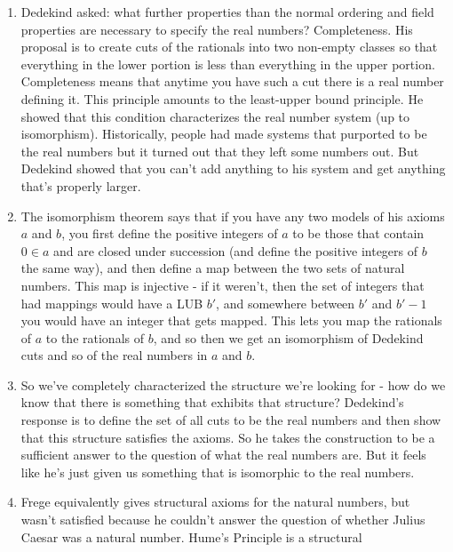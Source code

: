 \documentclass[12pt]{article}
\theoremstyle{definition}
\begin{document}
\begin{enumerate}
    \item
        Dedekind asked: what further properties than the normal ordering and
        field properties are necessary to specify the real numbers?
        Completeness. His proposal is to create cuts of the rationals into two
        non-empty classes so that everything in the lower portion is less than
        everything in the upper portion. Completeness means that anytime you
        have such a cut there is a real number defining it. This principle
        amounts to the least-upper bound principle. He showed that this
        condition characterizes the real number system (up to isomorphism).
        Historically, people had made systems that purported to be the real
        numbers but it turned out that they left some numbers out. But Dedekind
        showed that you can't add anything to his system and get anything
        that's properly larger. 
    \item
        The isomorphism theorem says that if you have any two models of his
        axioms $a$ and $b$, you first define the positive integers of $a$ to be
        those that contain $0 \in a$ and are closed under succession (and
        define the positive integers of $b$ the same way), and then define a
        map between the two sets of natural numbers. This map is injective - if
        it weren't, then the set of integers that had mappings would have a LUB
        $b'$, and somewhere between $b'$ and $b' - 1$ you would have an integer
        that gets mapped. This lets you map the rationals of $a$ to the
        rationals of $b$, and so then we get an isomorphism of Dedekind cuts
        and so of the real numbers in $a$ and $b$. 
    \item
        So we've completely characterized the structure we're looking for - how
        do we know that there is something that exhibits that structure?
        Dedekind's response is to define the set of all cuts to be the real
        numbers and then show that this structure satisfies the axioms. So he
        takes the construction to be a sufficient answer to the question of
        what the real numbers are. But it feels like he's just given us
        something that is isomorphic to the real numbers. 
    \item
        Frege equivalently gives structural axioms for the natural numbers, but
        wasn't satisfied because he couldn't answer the question of whether
        Julius Caesar was a natural number. Hume's Principle is a structural

\end{enumerate}
\end{document}
